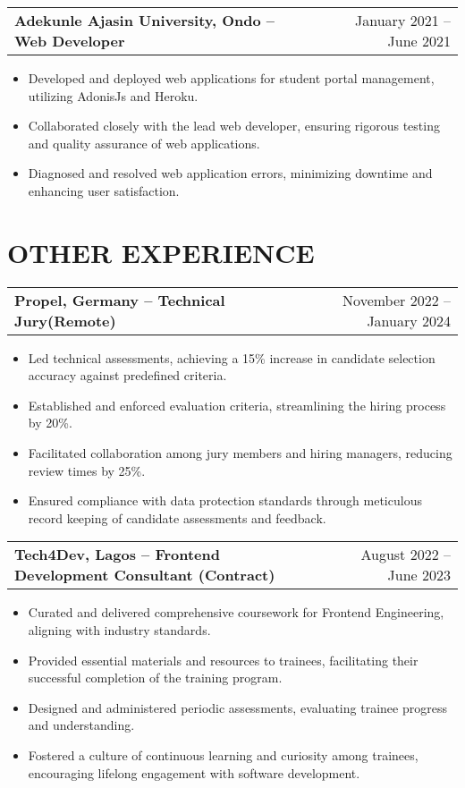 \documentclass[a4paper,12pt]{article}
\makeatletter
\newenvironment{joblong}[2]
    {
    \begin{tabularx}{\linewidth}{@{}l X r@{}}
    \textbf{#1} & \hfill &  #2 \\[3.75pt]
    \end{tabularx}
    \begin{minipage}[t]{\linewidth}
    \begin{itemize}[nosep,after=\strut, leftmargin=1em, itemsep=3pt,label=--]
    }
    {
    \end{itemize}
    \end{minipage}    
    }
\makeatother
\begin{document}
\begin{joblong}{Adekunle Ajasin University, Ondo -- Web Developer}{January 2021 -- June 2021}
\item Developed and deployed web applications for student portal management, utilizing AdonisJs and Heroku.
\item Collaborated closely with the lead web developer, ensuring rigorous testing and quality assurance of web applications.
\item Diagnosed and resolved web application errors, minimizing downtime and enhancing user satisfaction.
\end{joblong}

\section{OTHER EXPERIENCE}

\begin{joblong}{Propel, Germany -- Technical Jury(Remote)}{November 2022 -- January 2024}
\item Led technical assessments, achieving a 15\% increase in candidate selection accuracy against predefined criteria.
\item Established and enforced evaluation criteria, streamlining the hiring process by 20\%.
\item Facilitated collaboration among jury members and hiring managers, reducing review times by 25\%.
\item Ensured compliance with data protection standards through meticulous record keeping of candidate assessments and feedback.
\end{joblong}

\begin{joblong}{Tech4Dev, Lagos -- Frontend Development Consultant (Contract)}{August 2022 -- June 2023}
\item Curated and delivered comprehensive coursework for Frontend Engineering, aligning with industry standards.
\item Provided essential materials and resources to trainees, facilitating their successful completion of the training program.
\item Designed and administered periodic assessments, evaluating trainee progress and understanding.
\item Fostered a culture of continuous learning and curiosity among trainees, encouraging lifelong engagement with software development.
\end{joblong}
\end{document}
